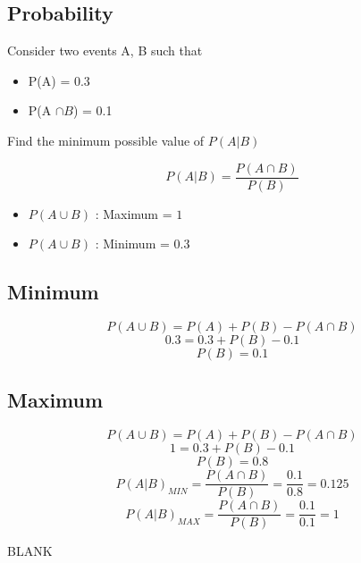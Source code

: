 \documentclass[]{report}
\begin{document}
	\large 
	\subsection*{Probability}
	
	Consider two events A, B such that
	
	\begin{itemize}
		\item P(A) = 0.3
		\item P(A $\cap B$) = 0.1
	\end{itemize}
	
	\begin{framed}
	Find the minimum possible value of $P(A|B)$
	
	\[ P(A|B) = \frac{P(A \cap B) }{P(B)}\]
	
	\end{framed}
	\begin{itemize}
		\item $P(A \cup B)$ : Maximum = $1$
		\item $P(A \cup B)$ : Minimum = $0.3$
	\end{itemize}
	
	\subsection*{Minimum}
	
	\[ P(A \cup B) = P(A) + P(B) - P(A \cap B)\]
	\[ 0.3 = 0.3 + P(B) - 0.1 \]
	\[ P(B) = 0.1\] 
	
	\subsection*{Maximum}
	
	\[ P(A \cup B) = P(A) + P(B) - P(A \cap B)\]
	\[ 1 = 0.3 + P(B) - 0.1 \]
	\[P(B) = 0.8\]
	\bigskip 
	\[ P(A|B)_{MIN} = \frac{P(A \cap B) }{P(B)} = \frac{0.1}{0.8} = 0.125 \]
	\[ P(A|B)_{MAX} = \frac{P(A \cap B) }{P(B)} = \frac{0.1}{0.1} = 1 \]

\newpage 
BLANK	
\end{document}
